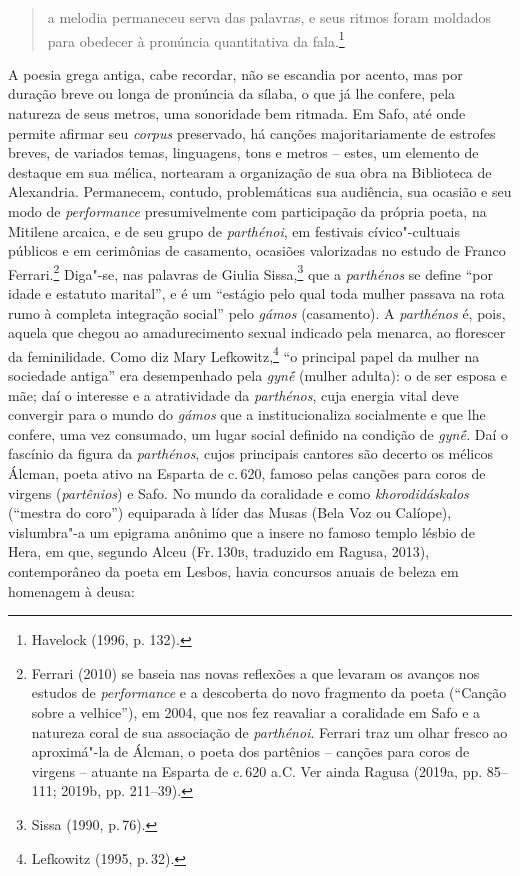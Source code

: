 \begin{quote}
a melodia permaneceu serva
das palavras, e seus ritmos foram moldados para obedecer à pronúncia
quantitativa da fala.\footnote{ Havelock (1996, p. 132).}
\end{quote}

 A poesia grega antiga, cabe recordar, não se
escandia por acento, mas por duração breve ou longa de pronúncia da sílaba, o
que já lhe confere, pela natureza de seus metros, uma sonoridade bem ritmada. Em Safo, até onde permite afirmar seu \textit{corpus} preservado,
há canções majoritariamente de estrofes breves, de variados temas,
linguagens, tons e metros -- estes, um elemento de destaque em sua mélica, nortearam a organização de sua obra na Biblioteca de Alexandria.
Permanecem, contudo, problemáticas
sua audiência, sua ocasião e seu modo de \textit{performance} presumivelmente com participação da própria poeta, na Mitilene arcaica, e de seu grupo de \textit{parthénoi}, em festivais cívico"-cultuais públicos e em cerimônias de casamento, ocasiões valorizadas no estudo de Franco Ferrari.\footnote{Ferrari (2010) se baseia nas novas reflexões a que levaram os avanços nos estudos de \textit{performance} e a descoberta do novo fragmento da poeta (``Canção sobre a velhice''), em 2004, que nos fez reavaliar a coralidade em Safo e a natureza coral de sua associação de \textit{parthénoi}. Ferrari traz um olhar fresco ao aproximá"-la de Álcman, o poeta dos partênios -- canções para coros de virgens -- atuante na Esparta de c.\,620 a.C. Ver ainda Ragusa (2019a, pp. 85--111; 2019b, pp. 211--39).}
Diga"-se, nas palavras de Giulia Sissa,\footnote{Sissa (1990, p.\,76).} que a \textit{parthénos} se define “por idade e estatuto marital”, e é um “estágio pelo qual toda mulher passava na rota rumo à completa integração social” pelo \textit{gámos} (casamento). A \textit{parthénos} é, pois, aquela que chegou ao amadurecimento sexual indicado pela menarca, ao florescer da feminilidade. Como diz Mary Lefkowitz,\footnote{Lefkowitz (1995, p.\,32).} “o principal papel da mulher na sociedade antiga” era desempenhado pela \textit{gynḗ } (mulher adulta): o de ser esposa e mãe; daí o interesse e a atratividade da \textit{parthénos}, cuja energia vital deve convergir para o mundo do \textit{gámos} que a institucionaliza socialmente e que lhe confere, uma vez consumado, um lugar social definido na condição de \textit{gynḗ.} Daí o fascínio da figura da \textit{parthénos}, cujos principais cantores são decerto os mélicos Álcman, poeta ativo na Esparta de c.\,620, famoso pelas canções para coros de virgens (\textit{partênios}) e Safo.
No mundo da coralidade e como \textit{khorodidáskalos} (``mestra do coro'') equiparada à líder das Musas (Bela Voz ou Calíope), vislumbra"-a um epigrama anônimo que a insere no famoso templo lésbio de Hera, em que, segundo Alceu (Fr.\,130\textsc{b}, traduzido em Ragusa, 2013), contemporâneo da poeta em Lesbos, havia concursos anuais de beleza em homenagem à deusa:

